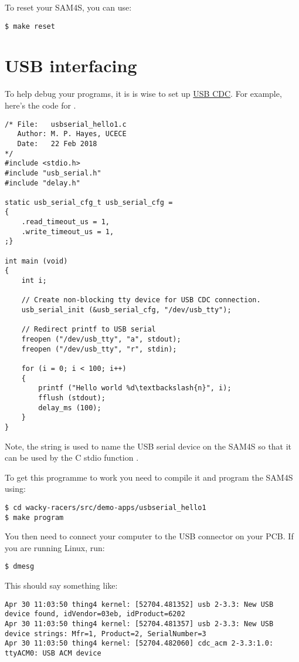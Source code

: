 To reset your SAM4S, you can use:
%
\begin{verbatim}
$ make reset
\end{verbatim}

\section{USB interfacing}
\label{usb-interfacing}

To help debug your programs, it is is wise to set up \href{USB_CDC}{USB
CDC}. For example, here's the code for
.

\begin{verbatim}
/* File:   usbserial_hello1.c
   Author: M. P. Hayes, UCECE
   Date:   22 Feb 2018
*/
#include <stdio.h>
#include "usb_serial.h"
#include "delay.h"

static usb_serial_cfg_t usb_serial_cfg =
{
    .read_timeout_us = 1,
    .write_timeout_us = 1,
;}

int main (void)
{
    int i;

    // Create non-blocking tty device for USB CDC connection.
    usb_serial_init (&usb_serial_cfg, "/dev/usb_tty");
    
    // Redirect printf to USB serial
    freopen ("/dev/usb_tty", "a", stdout);
    freopen ("/dev/usb_tty", "r", stdin);    

    for (i = 0; i < 100; i++)
    {
        printf ("Hello world %d\textbackslash{n}", i);
        fflush (stdout);
        delay_ms (100);
    }
}
\end{verbatim}

Note, the string  is used to name the USB serial
device on the SAM4S so that it can be used by the C stdio function
.   

To get this programme to work you need to compile it and program the SAM4S using:

\begin{verbatim}
$ cd wacky-racers/src/demo-apps/usbserial_hello1
$ make program
\end{verbatim}

You then need to connect your computer to the USB connector on your PCB.
If you are running Linux, run:
%
\begin{verbatim}
$ dmesg
\end{verbatim}

This should say something like:
%
\begin{verbatim}
Apr 30 11:03:50 thing4 kernel: [52704.481352] usb 2-3.3: New USB device found, idVendor=03eb, idProduct=6202
Apr 30 11:03:50 thing4 kernel: [52704.481357] usb 2-3.3: New USB device strings: Mfr=1, Product=2, SerialNumber=3
Apr 30 11:03:50 thing4 kernel: [52704.482060] cdc_acm 2-3.3:1.0: ttyACM0: USB ACM device
\end{verbatim}

